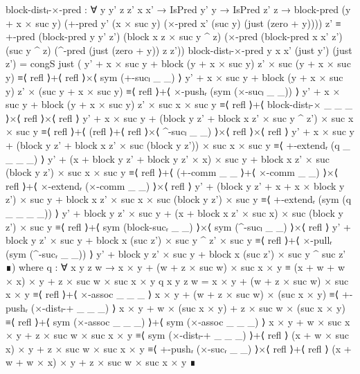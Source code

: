 \begin{code}[hide]
  block-distₗ-×-pred :
    ∀ {y y' z z'} x x' → IsPred y' y → IsPred z' z →
    block-pred
      (y + x × suc y)
      (+-pred y' (x × suc y) (×-pred x' (suc y) (just (zero + y))))
      z' ≡
    +-pred
      (block-pred y y' z')
      (block x z × suc y ^ z)
      (×-pred
        (block-pred x x' z')
        (suc y ^ z)
        (^-pred (just (zero + y)) z z'))
  block-distₗ-×-pred {y} x x' (just y') (just z') =
    congS just
      ( y' + x × suc y + block (y + x × suc y) z' × suc (y + x × suc y)                                   ≡⟨ refl ⟩+⟨ refl ⟩×⟨ sym (+-sucₗ _ _) ⟩
        y' + x × suc y + block (y + x × suc y) z' × (suc y + x × suc y)                                   ≡⟨ refl ⟩+⟨ ×-pushᵣ (sym (×-sucₗ _ _)) ⟩
        y' + x × suc y + block (y + x × suc y) z' × suc x × suc y                                         ≡⟨ refl ⟩+⟨ block-distₗ-× _ _ _ ⟩×⟨ refl ⟩×⟨ refl ⟩
        y' + x × suc y + (block y z' + block x z' × suc y ^ z') × suc x × suc y                         ≡⟨ refl ⟩+⟨ (refl ⟩+⟨ refl ⟩×⟨ ^-sucₗ _ _) ⟩×⟨ refl ⟩×⟨ refl ⟩
        y' + x × suc y + (block y z' + block x z' × suc (block y z')) × suc x × suc y                   ≡⟨ +-extendᵣ (q _ _ _ _) ⟩
        y' + (x + block y z' + block y z' × x) × suc y + block x z' × suc (block y z') × suc x × suc y ≡⟨ refl ⟩+⟨ (+-comm _ _ ⟩+⟨ ×-comm _ _) ⟩×⟨ refl ⟩+⟨ ×-extendᵣ (×-comm _ _) ⟩×⟨ refl ⟩
        y' + (block y z' + x + x × block y z') × suc y + block x z' × suc x × suc (block y z') × suc y ≡⟨ +-extendᵣ (sym (q _ _ _ _)) ⟩
        y' + block y z' × suc y + (x + block x z' × suc x) × suc (block y z') × suc y                   ≡⟨ refl ⟩+⟨ sym (block-sucᵣ _ _) ⟩×⟨ sym (^-sucₗ _ _) ⟩×⟨ refl ⟩
        y' + block y z' × suc y + block x (suc z') × suc y ^ z' × suc y                                 ≡⟨ refl ⟩+⟨ ×-pullᵣ (sym (^-sucᵣ _ _)) ⟩
        y' + block y z' × suc y + block x (suc z') × suc y ^ suc z'                                     ∎)
    where
    q :
      ∀ x y z w →
      x × y + (w + z × suc w) × suc x × y ≡
      (x + w + w × x) × y + z × suc w × suc x × y
    q x y z w =
      x × y + (w + z × suc w) × suc x × y               ≡⟨ refl ⟩+⟨ ×-assoc _ _ _ ⟩
      x × y + (w + z × suc w) × (suc x × y)             ≡⟨ +-pushᵣ (×-distₗ-+ _ _ _) ⟩
      x × y + w × (suc x × y) + z × suc w × (suc x × y) ≡⟨ refl ⟩+⟨ sym (×-assoc _ _ _) ⟩+⟨ sym (×-assoc _ _ _) ⟩
      x × y + w × suc x × y + z × suc w × suc x × y     ≡⟨ sym (×-distₗ-+ _ _ _) ⟩+⟨ refl ⟩
      (x + w × suc x) × y + z × suc w × suc x × y       ≡⟨ +-pushᵣ (×-sucᵣ _ _) ⟩×⟨ refl ⟩+⟨ refl ⟩
      (x + w + w × x) × y + z × suc w × suc x × y       ∎

\end{code}
